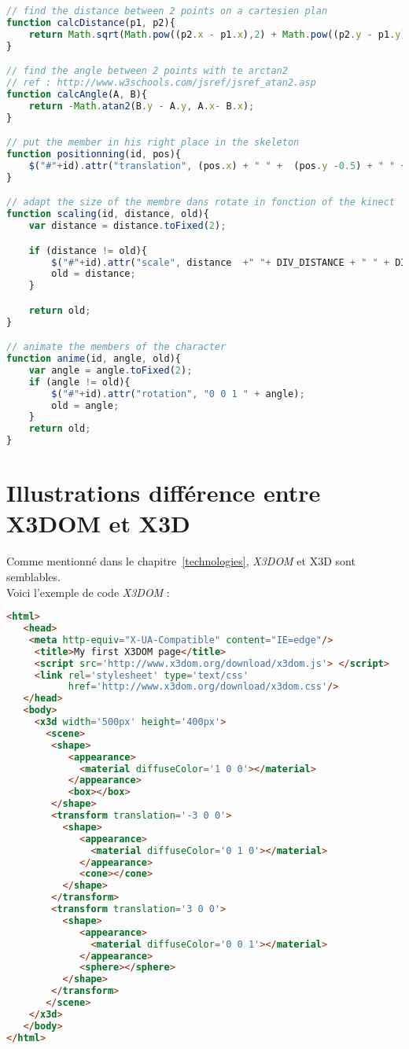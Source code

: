\begin{lstlisting}[language=JavaScript]
// find the distance between 2 points on a cartesien plan
function calcDistance(p1, p2){
	return Math.sqrt(Math.pow((p2.x - p1.x),2) + Math.pow((p2.y - p1.y),2));
}

// find the angle between 2 points with te arctan2
// ref : http://www.w3schools.com/jsref/jsref_atan2.asp
function calcAngle(A, B){
	return -Math.atan2(B.y - A.y, A.x- B.x);
}

// put the member in his right place in the skeleton
function positionning(id, pos){
	$("#"+id).attr("translation", (pos.x) + " " +  (pos.y -0.5) + " " + pos.z);
}

// adapt the size of the membre dans rotate in fonction of the kinect
function scaling(id, distance, old){
	var distance = distance.toFixed(2);

	if (distance != old){
		$("#"+id).attr("scale", distance  +" "+ DIV_DISTANCE + " " + DIV_DISTANCE );
		old = distance;
	}

	return old;
}

// animate the members of the character
function anime(id, angle, old){
	var angle = angle.toFixed(2);
	if (angle != old){
		$("#"+id).attr("rotation", "0 0 1 " + angle);
		old = angle;
	}
	return old;
}
\end{lstlisting}


\chapter{Illustrations différence entre X3DOM et X3D}
\lstset{style=mystyle}
Comme mentionné dans le chapitre~\ref{technologies}, \textit{X3DOM} et X3D sont semblables. \\
Voici l'exemple de code \textit{X3DOM} :
\begin{lstlisting}[language=Html]
<html> 
   <head>
    <meta http-equiv="X-UA-Compatible" content="IE=edge"/> 
     <title>My first X3DOM page</title> 
     <script src='http://www.x3dom.org/download/x3dom.js'> </script> 
     <link rel='stylesheet' type='text/css' 
           href='http://www.x3dom.org/download/x3dom.css'/> 
   </head> 
   <body> 
	 <x3d width='500px' height='400px'> 
	   <scene> 
		<shape> 
		   <appearance> 
			 <material diffuseColor='1 0 0'></material> 
		   </appearance> 
		   <box></box> 
		</shape> 
		<transform translation='-3 0 0'> 
		  <shape> 
			 <appearance> 
			   <material diffuseColor='0 1 0'></material> 
			 </appearance> 
			 <cone></cone> 
		  </shape> 
		</transform> 
		<transform translation='3 0 0'> 
		  <shape> 
			 <appearance> 
			   <material diffuseColor='0 0 1'></material> 
			 </appearance> 
			 <sphere></sphere> 
		  </shape> 
		</transform> 
	   </scene> 
	</x3d> 
   </body> 
</html> 
\end{lstlisting}

